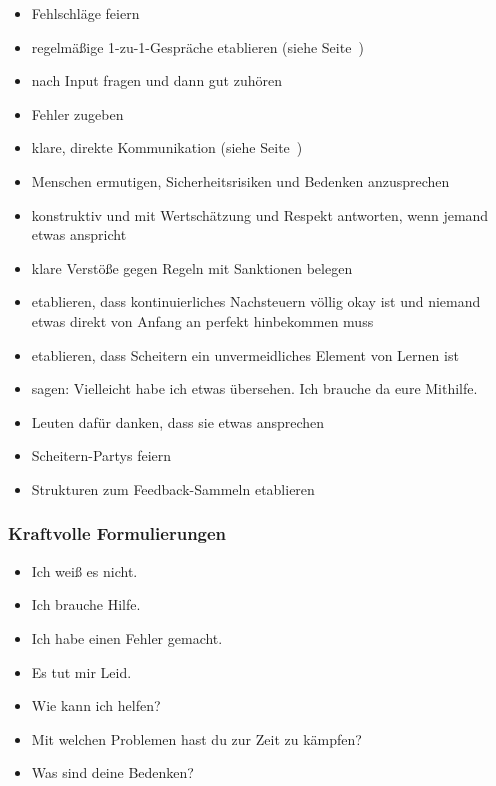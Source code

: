 \begin{itemize}
  \item Fehlschläge feiern 
  \item regelmäßige 1-zu-1-Gespräche etablieren (siehe Seite~\pageref{1-zu-1}) 
  \item nach Input fragen und dann gut zuhören  
  \item Fehler zugeben 
  \item klare, direkte Kommunikation (siehe Seite~\pageref{direkte-kommunikation}) 
  \item Menschen ermutigen, Sicherheitsrisiken und Bedenken anzusprechen
  \item konstruktiv und mit Wertschätzung und Respekt antworten, wenn jemand etwas anspricht  
  \item klare Verstöße gegen Regeln mit Sanktionen belegen  
  \item etablieren, dass kontinuierliches Nachsteuern völlig okay ist und niemand etwas direkt von Anfang an perfekt hinbekommen muss  
  \item etablieren, dass Scheitern ein unvermeidliches Element von Lernen ist 
  \item sagen: \glqq Vielleicht habe ich etwas übersehen. Ich brauche da eure Mithilfe.\grqq {}
  \item Leuten dafür danken, dass sie etwas ansprechen 
  \item Scheitern-Partys feiern 
  \item Strukturen zum Feedback-Sammeln etablieren 
\end{itemize}


\subsubsection{Kraftvolle Formulierungen}

\begin{itemize}
  \item \glqq Ich weiß es nicht.\grqq
  \item \glqq Ich brauche Hilfe.\grqq
  \item \glqq Ich habe einen Fehler gemacht.\grqq
  \item \glqq Es tut mir Leid.\grqq
  \item \glqq Wie kann ich helfen?\grqq
  \item \glqq Mit welchen Problemen hast du zur Zeit zu kämpfen?\grqq
  \item \glqq Was sind deine Bedenken?\grqq
\end{itemize}


